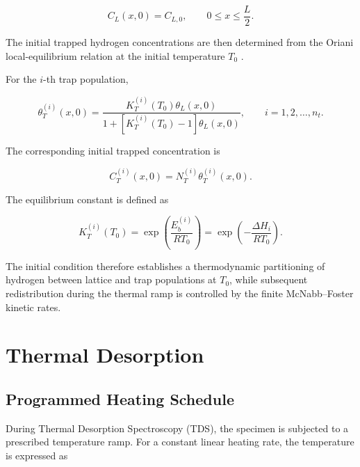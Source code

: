 \begin{equation}
C_L(x,0)=C_{L,0},
\qquad
0\leq x\leq \frac{L}{2}.
\label{eq:ch3_ic_CL}
\end{equation}

The initial trapped hydrogen concentrations are then determined from
the Oriani local-equilibrium relation at the initial temperature
$T_0$ \cite{Oriani1970,Diaz2020,Marrani2025}.

For the $i$-th trap population,

\begin{equation}
\theta_T^{(i)}(x,0)
=
\frac{
K_T^{(i)}(T_0)\theta_L(x,0)
}{
1+
\left[
K_T^{(i)}(T_0)-1
\right]
\theta_L(x,0)
},
\qquad
i=1,2,\ldots,n_t.
\label{eq:ch3_ic_oriani_theta}
\end{equation}

The corresponding initial trapped concentration is

\begin{equation}
C_T^{(i)}(x,0)
=
N_T^{(i)}
\theta_T^{(i)}(x,0).
\label{eq:ch3_ic_oriani_CT}
\end{equation}

The equilibrium constant is defined as

\begin{equation}
K_T^{(i)}(T_0)
=
\exp\left(
\frac{E_b^{(i)}}{RT_0}
\right)
=
\exp\left(
-\frac{\Delta H_i}{RT_0}
\right).
\label{eq:ch3_oriani_KT}
\end{equation}

The initial condition therefore establishes a thermodynamic
partitioning of hydrogen between lattice and trap populations at
$T_0$, while subsequent redistribution during the thermal ramp is
controlled by the finite McNabb--Foster kinetic rates.

\section{Thermal Desorption}
\label{sec:thermal_desorption}

\subsection{Programmed Heating Schedule}
\label{subsec:heating_schedule}

During Thermal Desorption Spectroscopy (TDS), the specimen is subjected
to a prescribed temperature ramp. For a constant linear heating rate,
the temperature is expressed as

